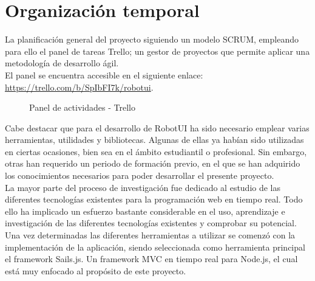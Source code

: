 
\newpage


\chapter{Organización temporal}
\label{chap:planificación}

La planificación general del proyecto siguiendo un modelo SCRUM, empleando para ello el panel de tareas Trello; un gestor de proyectos que permite aplicar una metodología de desarrollo ágil.\\

El panel se encuentra accesible en el siguiente enlace: \url{https://trello.com/b/SpIbFI7k/robotui}.

\begin{figure}[H]
\caption{Panel de actividades - Trello}
\end{figure}


Cabe destacar que para el desarrollo de RobotUI ha sido necesario emplear varias herramientas, utilidades y bibliotecas. Algunas de ellas ya habían sido utilizadas en ciertas ocasiones, bien sea en el ámbito estudiantil o profesional. 
Sin embargo, otras han requerido un periodo de formación previo, en el que se han adquirido los conocimientos necesarios para poder desarrollar el presente proyecto.\\

La mayor parte del proceso de investigación fue dedicado al estudio de las diferentes tecnologías existentes para la programación web en tiempo real. Todo ello ha implicado un esfuerzo bastante considerable en el uso, 
aprendizaje e investigación de las diferentes tecnologías existentes y comprobar su potencial.\\

Una vez determinadas las diferentes herramientas a utilizar se comenzó con la implementación de la aplicación, siendo seleccionada como herramienta principal el framework Sails.js. Un framework MVC en 
tiempo real para Node.js, el cual está muy enfocado al propósito de este proyecto.\\

